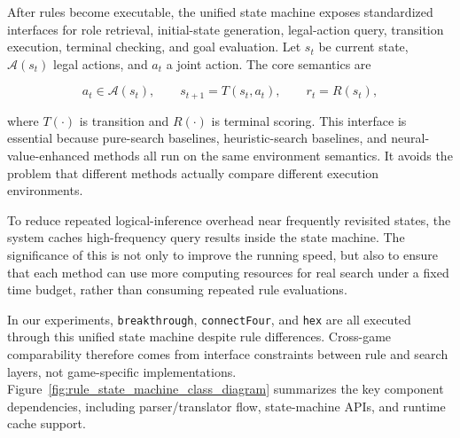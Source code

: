 After rules become executable, the unified state machine exposes standardized interfaces for role retrieval, initial-state generation, legal-action query, transition execution, terminal checking, and goal evaluation. Let $s_t$ be current state, $\mathcal{A}(s_t)$ legal actions, and $a_t$ a joint action. The core semantics are

\begin{equation}
a_t \in \mathcal{A}(s_t),\qquad s_{t+1}=T(s_t,a_t),\qquad r_t=R(s_t),
\end{equation}


where $T(\cdot)$ is transition and $R(\cdot)$ is terminal scoring. This interface is essential because pure-search baselines, heuristic-search baselines, and neural-value-enhanced methods all run on the same environment semantics. It avoids the problem that different methods actually compare different execution environments.

To reduce repeated logical-inference overhead near frequently revisited states, the system caches high-frequency query results inside the state machine. The significance of this is not only to improve the running speed, but also to ensure that each method can use more computing resources for real search under a fixed time budget, rather than consuming repeated rule evaluations.


In our experiments, \texttt{breakthrough}, \texttt{connectFour}, and \texttt{hex} are all executed through this unified state machine despite rule differences. Cross-game comparability therefore comes from interface constraints between rule and search layers, not game-specific implementations.
Figure~\ref{fig:rule_state_machine_class_diagram} summarizes the key component dependencies, including parser/translator flow, state-machine APIs, and runtime cache support.


